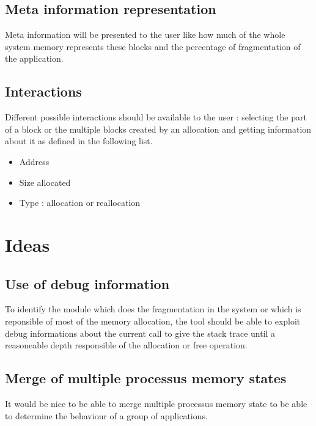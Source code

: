 \subsection{Meta information representation}
Meta information will be presented to the user like how much of the whole system memory represents these blocks and the percentage of fragmentation of the application.

\subsection{Interactions}
Different possible interactions should be available to the user : selecting the part of a block or the multiple blocks created by an allocation and getting information about it as defined in the following list.
\begin{itemize}
    \item Address
    \item Size allocated 
    \item Type : allocation or reallocation
\end{itemize}

\section{Ideas}
    
    \subsection{Use of debug information}
To identify the module which does the fragmentation in the system or which is reponsible of most of the memory allocation, the tool should be able to exploit debug informations about the current call to give the stack trace until a reasoneable depth responsible of the allocation or free operation.
    
    \subsection{Merge of multiple processus memory states}
It would be nice to be able to merge multiple processus memory state to be able to determine the behaviour of a group of applications.
